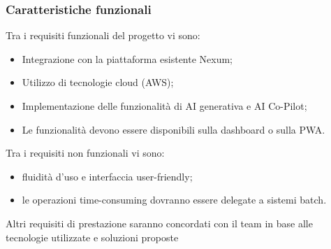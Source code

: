 \documentclass[a4paper,11pt]{article}
\begin{document}
\subsubsection{Caratteristiche funzionali}
Tra i requisiti funzionali del progetto vi sono:
\begin{itemize}[noitemsep, topsep=0pt]
 \item Integrazione con la piattaforma esistente Nexum;
 \item Utilizzo di tecnologie cloud (AWS);
 \item Implementazione delle funzionalità di AI generativa e AI Co-Pilot;
 \item Le funzionalità devono essere disponibili sulla dashboard o sulla PWA.
\end{itemize}
\vspace{0.5em}
Tra i requisiti non funzionali vi sono:
\begin{itemize}[noitemsep, topsep=0pt]
 \item fluidità d'uso e interfaccia user-friendly;
 \item le operazioni time-consuming dovranno essere delegate a sistemi batch.
\end{itemize}
Altri requisiti di prestazione saranno concordati con il team in base alle tecnologie utilizzate e soluzioni proposte
\end{document}

